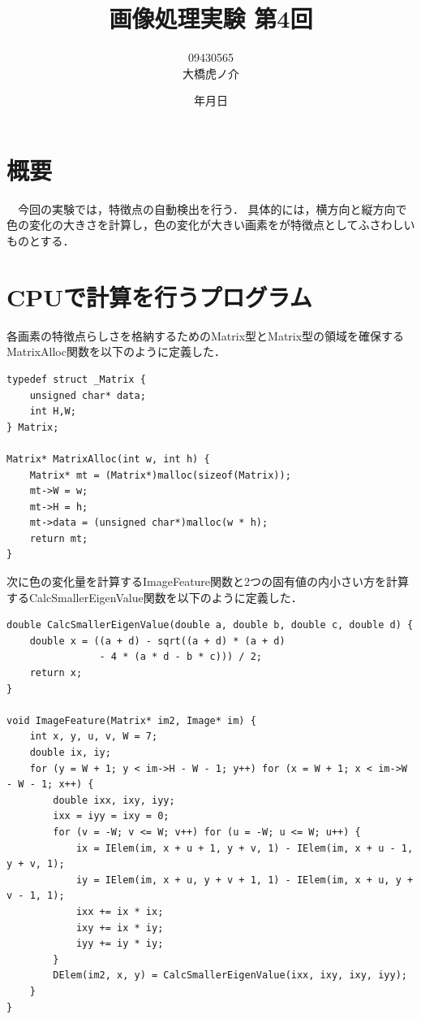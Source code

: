 \documentclass[11pt]{jarticle}
\begin{document}
\title{画像処理実験 第4回}
\author{09430565\\大橋虎ノ介}
\date{\number\year 年\number\month 月\number\day 日}
\maketitle

\section{概要}

　今回の実験では，特徴点の自動検出を行う．
具体的には，横方向と縦方向で色の変化の大きさを計算し，色の変化が大きい画素をが特徴点としてふさわしいものとする．

\section{CPUで計算を行うプログラム}

各画素の特徴点らしさを格納するためのMatrix型とMatrix型の領域を確保するMatrixAlloc関数を以下のように定義した．

\begin{lstlisting}
typedef struct _Matrix {
    unsigned char* data;
    int H,W;
} Matrix;

Matrix* MatrixAlloc(int w, int h) {
    Matrix* mt = (Matrix*)malloc(sizeof(Matrix));
    mt->W = w;
    mt->H = h;
    mt->data = (unsigned char*)malloc(w * h);
    return mt;
}
\end{lstlisting}

次に色の変化量を計算するImageFeature関数と2つの固有値の内小さい方を計算するCalcSmallerEigenValue関数を以下のように定義した．

\begin{lstlisting}
double CalcSmallerEigenValue(double a, double b, double c, double d) {
    double x = ((a + d) - sqrt((a + d) * (a + d) 
                - 4 * (a * d - b * c))) / 2;
    return x;
}

void ImageFeature(Matrix* im2, Image* im) {
    int x, y, u, v, W = 7;
    double ix, iy;
    for (y = W + 1; y < im->H - W - 1; y++) for (x = W + 1; x < im->W - W - 1; x++) {
        double ixx, ixy, iyy;
        ixx = iyy = ixy = 0;
        for (v = -W; v <= W; v++) for (u = -W; u <= W; u++) {
            ix = IElem(im, x + u + 1, y + v, 1) - IElem(im, x + u - 1, y + v, 1);
            iy = IElem(im, x + u, y + v + 1, 1) - IElem(im, x + u, y + v - 1, 1);
            ixx += ix * ix;
            ixy += ix * iy;
            iyy += iy * iy;
        }
        DElem(im2, x, y) = CalcSmallerEigenValue(ixx, ixy, ixy, iyy);
    }
}
\end{lstlisting}
\end{document}
